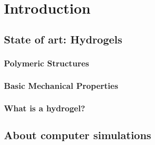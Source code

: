\chapter{Introduction}\label{ch1:Intro}





\section{State of art: Hydrogels}

\subsection{Polymeric Structures}

\subsection{Basic Mechanical Properties}

\subsection{What is a hydrogel?}

\section{About computer simulations}






